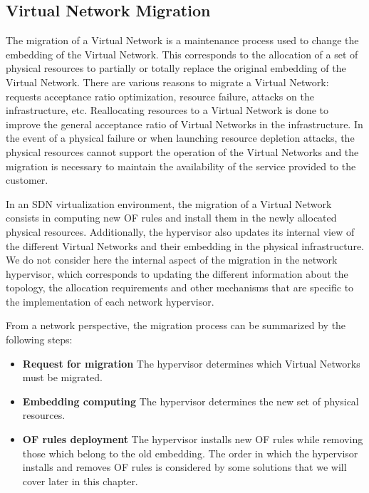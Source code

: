 

\subsection{Virtual Network Migration}
The migration of a Virtual Network is a maintenance process used to change the embedding of the Virtual Network. 
This corresponds to the allocation of a set of physical resources to partially or totally replace the original embedding of the Virtual Network.
There are various reasons to migrate a Virtual Network: requests acceptance ratio optimization, resource failure, attacks on the infrastructure, etc.
Reallocating resources to a Virtual Network is done to improve the general acceptance ratio of Virtual Networks in the infrastructure.
In the event of a physical failure or when launching resource depletion attacks, the physical resources cannot support the operation of the Virtual Networks and the migration is necessary to maintain the availability of the service provided to the customer.

In an SDN virtualization environment, the migration of a Virtual Network consists in computing new OF rules and install them in the newly allocated physical resources. Additionally, the hypervisor also updates its internal view of the different Virtual Networks and their embedding in the physical infrastructure.
We do not consider here the internal aspect of the migration in the network hypervisor, which corresponds to updating the different information about the topology, the allocation requirements and other mechanisms that are specific to the implementation of each network hypervisor.

From a network perspective, the migration process can be summarized by the following steps:

\begin{itemize}
    \item \textbf{Request for migration} The hypervisor determines which Virtual Networks must be migrated.
    \item \textbf{Embedding computing} The hypervisor determines the new set of physical resources.
    \item \textbf{OF rules deployment} The hypervisor installs new OF rules while removing those which belong to the old embedding.
The order in which the hypervisor installs and removes OF rules is considered by some solutions that we will cover later in this chapter.
\end{itemize}

